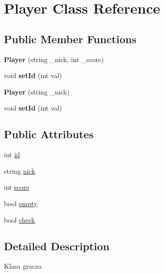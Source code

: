 \hypertarget{classPlayer}{\section{Player Class Reference}
\label{classPlayer}
}
\subsection*{Public Member Functions}
\begin{DoxyCompactItemize}
\item 
\hypertarget{classPlayer_abdbd6b6f0fec2df19dd23d3129cbadb9}{{\bfseries Player} (string \-\_\-nick, int \-\_\-score)}\label{classPlayer_abdbd6b6f0fec2df19dd23d3129cbadb9}

\item 
\hypertarget{classPlayer_aae48749805799debc558ad74c2cfbc8d}{void {\bfseries set\-Id} (int val)}\label{classPlayer_aae48749805799debc558ad74c2cfbc8d}

\item 
\hypertarget{classPlayer_aa206440e032fa4a2ff1ea4ebf7814897}{{\bfseries Player} (string \-\_\-nick)}\label{classPlayer_aa206440e032fa4a2ff1ea4ebf7814897}

\item 
\hypertarget{classPlayer_aae48749805799debc558ad74c2cfbc8d}{void {\bfseries set\-Id} (int val)}\label{classPlayer_aae48749805799debc558ad74c2cfbc8d}

\end{DoxyCompactItemize}
\subsection*{Public Attributes}
\begin{DoxyCompactItemize}
\item 
int \hyperlink{classPlayer_a05e05f3a23de78da7ec032ec2bcf8c6c}{id}
\item 
string \hyperlink{classPlayer_aea2f8abddadf8deb423a3c9b507d1ccc}{nick}
\item 
int \hyperlink{classPlayer_ace6abae8d66534ad0a1fd6458f786a6e}{score}
\item 
bool \hyperlink{classPlayer_a8039b9f17594c036c3bd7b676a24b19e}{empty}
\item 
bool \hyperlink{classPlayer_a1b72316124caf757250c3cee1c4416ff}{check}
\end{DoxyCompactItemize}


\subsection{Detailed Description}
Klasa gracza 

